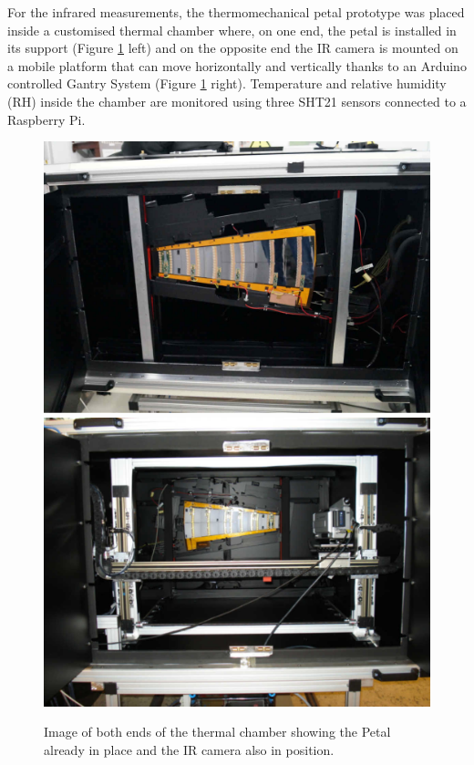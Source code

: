 		For the infrared measurements, the thermomechanical petal prototype was placed inside a customised thermal chamber where, on one end, the petal is installed in its support (Figure \ref{fig2.3} left) and on the opposite end the IR camera is mounted on a mobile platform that can move horizontally and vertically thanks to an Arduino controlled Gantry System (Figure \ref{fig2.3} right). Temperature and relative humidity (RH) inside the chamber are monitored using three SHT21 sensors connected  to a Raspberry Pi. 
		
		\begin{figure}[ht!]
			\centering
			\captionsetup{justification=centering,margin=2cm}
			\includegraphics[scale=0.25]{Figures/Chapter02/ChamberBack.jpg}
			\includegraphics[scale=0.26]{Figures/Chapter02/CamberFront.jpg}
			\caption{Image of both ends of the thermal chamber showing the Petal already in place and the IR camera also in position.}\label{fig2.3}
		\end{figure}
		
